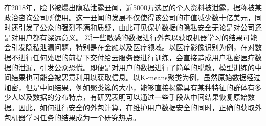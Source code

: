 在2018年，脸书被爆出隐私泄露丑闻，近5000万选民的个人资料被泄露，据称被某政治咨询公司所使用。这一丑闻的发展不仅使得该公司的市值减少数十亿美元，同时还引发了公众的强烈不满和质疑，由此可见保护数据的隐私安全无论是对公司还是对用户都有深远意义。
将一些敏感的数据进行外包以获取机器学习的结果可能会引发隐私泄漏问题，特别是在金融以及医疗领域。以医疗影像识别为例，在对数据不进行任何处理的前提下交付给云服务器进行训练，会直接造成用户私密医疗数据的泄漏，引发公众恐慌。即便是对用户的数据进行了简单的脱敏，模型训练的中间结果也可能会被恶意利用以获取信息。以K-means聚类为例，虽然原始数据经过加密，但是中间结果，例如聚类簇的大小，能够直接揭露具有某种特征的群体有多少人以及数据的分布特点，有研究表明可以通过一些手段从中间结果恢复原始数据\cite{liu2021when}。因此，如何进行安全的外包计算，在维护用户数据安全的同时，正确的获取外包机器学习任务的结果成为一个研究热点。

